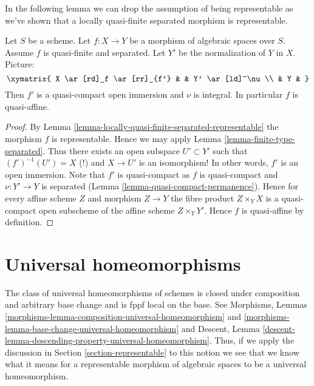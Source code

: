\noindent
In the following lemma we can drop the assumption of being
representable as we've shown that a locally quasi-finite
separated morphism is representable.

\begin{lemma}
\label{lemma-quasi-finite-separated-quasi-affine}
Let $S$ be a scheme.
Let $f : X \to Y$ be a morphism of algebraic spaces over $S$.
Assume $f$ is quasi-finite and separated.
Let $Y'$ be the normalization of $Y$ in $X$.
Picture:
$$
\xymatrix{
X \ar[rd]_f \ar[rr]_{f'} & & Y' \ar[ld]^\nu \\
& Y &
}
$$
Then $f'$ is a quasi-compact open immersion and $\nu$ is integral.
In particular $f$ is quasi-affine.
\end{lemma}

\begin{proof}
By Lemma \ref{lemma-locally-quasi-finite-separated-representable}
the morphism $f$ is representable. Hence we may apply
Lemma \ref{lemma-finite-type-separated}. Thus there exists an open
subspace $U' \subset Y'$ such that
$(f')^{-1}(U') = X$ (!) and $X \to U'$ is an isomorphism! In other
words, $f'$ is an open immersion. Note that $f'$ is quasi-compact as
$f$ is quasi-compact and $\nu : Y' \to Y$ is separated
(Lemma \ref{lemma-quasi-compact-permanence}).
Hence for every affine scheme $Z$ and morphism $Z \to Y$ the
fibre product $Z \times_Y X$ is a quasi-compact open subscheme
of the affine scheme $Z \times_Y Y'$. Hence $f$ is quasi-affine by
definition.
\end{proof}








\section{Universal homeomorphisms}
\label{section-universal-homeomorphisms}

\noindent
The class of universal homeomorphisms of schemes is closed under
composition and arbitrary base change and is fppf local on the base. See
Morphisms, Lemmas
\ref{morphisms-lemma-composition-universal-homeomorphism} and
\ref{morphisms-lemma-base-change-universal-homeomorphism} and
Descent, Lemma \ref{descent-lemma-descending-property-universal-homeomorphism}.
Thus, if we apply the discussion in
Section \ref{section-representable}
to this notion we see that we know what it means for a representable
morphism of algebraic spaces to be a universal homeomorphism.

